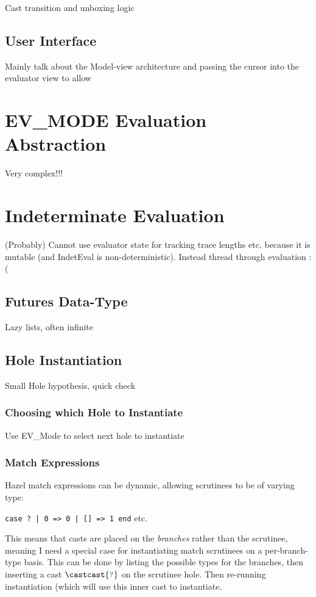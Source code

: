 Cast transition and unboxing logic

\subsection{User Interface}
Mainly talk about the Model-view architecture and passing the cursor into the evaluator view to allow 


\section{EV\_MODE Evaluation Abstraction}
Very complex!!!

\section{Indeterminate Evaluation}\label{sec:IndetEval}
(Probably) Cannot use evaluator state for tracking trace lengths etc. because it is mutable (and IndetEval is non-deterministic). Instead thread through evaluation :(

\subsection{Futures Data-Type}\label{sec:Futures}
Lazy lists, often infinite
\subsection{Hole Instantiation}\label{sec:HoleInstantiation}
Small Hole hypothesis, quick check


\subsubsection{Choosing which Hole to Instantiate}
Use EV\_Mode to select next hole to instantiate

\subsubsection{Match Expressions}
Hazel match expressions can be dynamic, allowing scrutinees to be of varying type:

\texttt{case ? | 0 => 0 | [] => 1 end} etc.

This means that casts are placed on the \textit{branches} rather than the scrutinee, meaning I need a special case for instantiating match scrutinees on a per-branch-type basis. This can be done by listing the possible types for the branches, then inserting a cast $\castcast{\dyn}$ on the scrutinee hole. Then re-running instantiation (which will use this inner cast to instantiate.

